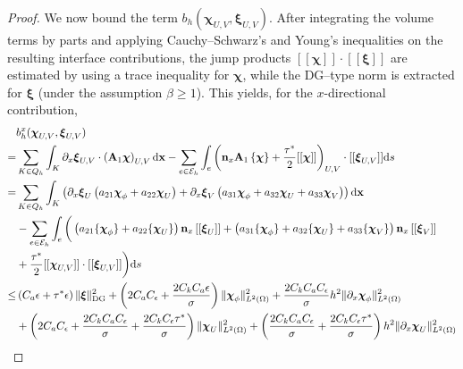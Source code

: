 \documentclass[pdflatex,sn-mathphys-num]{sn-jnl}%
\theoremstyle{thmstyleone}%
\theoremstyle{thmstyletwo}%
\theoremstyle{thmstylethree}%
\begin{document}
\begin{proof}
We now bound the term $b_h(\boldsymbol{\chi}_{U,V}, \boldsymbol{\xi}_{U,V})$. After integrating the volume terms by parts and applying Cauchy--Schwarz's and Young’s inequalities on the resulting interface contributions, the jump products $[[\boldsymbol{\chi}]] \cdot [[\boldsymbol{\xi}]]$ are estimated by using a trace inequality for $\boldsymbol{\chi}$, while the DG--type norm is extracted for $\boldsymbol{\xi}$ (under the assumption $\beta\ge 1$). This yields, for the $x$-directional contribution,
\begin{equation}\notag
\begin{aligned}
&b_h^x(\boldsymbol{\chi}_{U,V}, \boldsymbol{\xi}_{U,V})\\
=&\sum_{K \in Q_h} \int_K \partial_x \boldsymbol{\xi}_{U,V} \cdot \left(\mathbf{A}_{1} \boldsymbol{\chi}\right)_{U,V} \mathrm{d} \mathbf{x}  -\sum_{e \in \mathcal{E}_h} \int_e  \left( \mathbf{n}_x \mathbf{A}_{1}\left\{\boldsymbol{\chi}\right\} + \frac{\tau^*}{2} [[\boldsymbol{\chi}]]\right)_{U,V} \cdot [[\boldsymbol{\xi}_{U,V}]]  \mathrm{d} s\\
=&\sum_{K \in Q_h} \int_K  \left( \partial_x \boldsymbol{\xi}_{U} \left( a_{21} \boldsymbol{\chi}_{\phi} + a_{22} \boldsymbol{\chi}_{U}\right)  + \partial_x \boldsymbol{\xi}_{V} \left( a_{31} \boldsymbol{\chi}_{\phi} + a_{32} \boldsymbol{\chi}_{U} + a_{33} \boldsymbol{\chi}_{V}\right)  \right) \mathrm{d} \mathbf{x}  \\
&- \sum_{e \in \mathcal{E}_h} \int_e \bigg( \left(  a_{21}\{\boldsymbol{\chi}_{\phi}\} + a_{22}\{\boldsymbol{\chi}_{U}\} \right)\mathbf{n}_x \, [[\boldsymbol{\xi}_{U}]] + \left(  a_{31}\{\boldsymbol{\chi}_{\phi}\} + a_{32}\{\boldsymbol{\chi}_{U}\} + a_{33}\{\boldsymbol{\chi}_{V}\} \right)\mathbf{n}_x \, [[\boldsymbol{\xi}_{V}]]  \\
&+ \frac{\tau^*}{2} [[\boldsymbol{\chi}_{U,V}]]\cdot [[\boldsymbol{\xi}_{U,V}]] \bigg) \mathrm{d} s\\
\le&
 \left(C_a \epsilon + \tau^*\epsilon \right)\| \boldsymbol{\xi}\|_{\mathrm{DG}}^2 + \left( 2C_a C_\epsilon + \frac{2C_k C_a\epsilon}{\sigma} \right) \|\boldsymbol{\chi}_{\phi}\|_{L^2(\Omega)}^2 + \frac{2C_k C_aC
 _\epsilon}{\sigma}h^2\|\partial_x \boldsymbol{\chi}_{\phi}\|_{L^2(\Omega)}^2  \\
&+ \left( 2C_a C_\epsilon + \frac{2C_k C_aC_\epsilon}{\sigma}+ \frac{2C_k C_\epsilon \tau^*}{\sigma}\right) \|\boldsymbol{\chi}_{U}\|_{L^2(\Omega)}^2+ \left(\frac{2C_k C_aC_\epsilon}{\sigma}+ \frac{2C_kC_\epsilon \tau^*}{\sigma} \right) h^2\|\partial_x \boldsymbol{\chi}_{U}\|_{L^2(\Omega)}^2 \\

\end{aligned}
\end{equation}
\end{proof}
\end{document}
